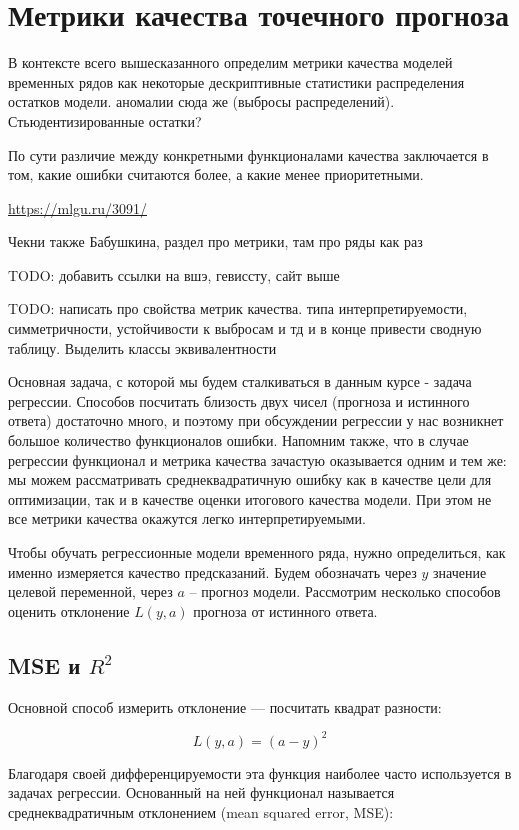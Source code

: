 \section{Метрики качества точечного прогноза}
\label{sec:metrics}

В контексте всего вышесказанного определим метрики качества моделей
временных рядов как некоторые дескриптивные статистики распределения
остатков модели. аномалии сюда же (выбросы распределений).
Стьюдентизированные остатки?

По сути различие между конкретными функционалами качества заключается
в том, какие ошибки считаются более, а какие менее приоритетными.

\url{https://mlgu.ru/3091/}

Чекни также Бабушкина, раздел про метрики, там про ряды как раз

TODO: добавить ссылки на вшэ, гевиссту, сайт выше

TODO: написать про свойства метрик качества. типа интерпретируемости,
симметричности, устойчивости к выбросам и тд и в конце привести
сводную таблицу. Выделить классы эквивалентности

Основная задача, с которой мы будем сталкиваться в данным курсе -
задача регрессии. Способов посчитать близость двух чисел
(прогноза и истинного ответа) достаточно много, и поэтому при
обсуждении регрессии у нас возникнет большое количество функционалов ошибки.
Напомним также, что в случае регрессии функционал и метрика качества
зачастую оказывается одним и тем же: мы можем рассматривать
среднеквадратичную ошибку как в качестве цели для оптимизации, так
и в качестве оценки итогового качества модели. При этом не все
метрики качества окажутся легко интерпретируемыми.

Чтобы обучать регрессионные модели временного ряда, нужно
определиться, как именно измеряется качество предсказаний. Будем
обозначать через \( y \) значение целевой переменной, через \( a \) --
прогноз модели.
Рассмотрим несколько способов оценить отклонение \( L(y, a) \)
прогноза от истинного ответа.

\subsection*{MSE и \( R^2 \)}
Основной способ измерить отклонение — посчитать квадрат разности:

\[ L(y, a) = (a - y)^2 \]

Благодаря своей дифференцируемости эта функция наиболее часто
используется в задачах регрессии. Основанный на ней функционал
называется среднеквадратичным отклонением (mean squared error, MSE):

